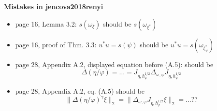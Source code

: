 \documentclass{article}
\begin{document}
{\Large \bf Mistakes in jencova2018renyi}

\vskip 1cm

\begin{itemize}
\item page 16, Lemma 3.2: $s(\omega_\xi)$ should be $s(\omega_{\xi^*})$

\item page 16, proof of Thm. 3.3: $u^*u=s(\psi)$ should be $u^*u=s(\omega_{\xi^*_\psi})$

\item page 28, Appendix A.2, displayed equation before (A.5): should be 
\[
\Delta(\eta/\varphi)=\dots= J_{\eta,h_\varphi^{1/2}}\Delta_{\omega,\varphi}J_{\eta,h_\varphi^{1/2}}
\]


\item page 28, Appendix A.2, eq. (A.5) should be
\[
\|\Delta(\eta/\varphi)^\gamma\xi\|_2=\|\Delta_{\omega,\varphi}J_{\eta,h_\varphi^{1/2}}\xi\|_2=\dots??
\]

\end{itemize}
\end{document}
